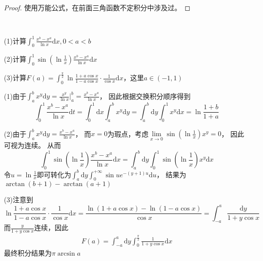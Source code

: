 \begin{proof}
  使用万能公式，在前面三角函数不定积分中涉及过。
\end{proof}

~

\begin{exercise}[积分：涉及$\frac{x^b - x^a}{\ln x}$型]
  (1)计算$\int_0^1 \frac{x^b - x^a}{\ln x}\mathrm{d} x, 0 < a < b$

  (2)计算$\int_0^1 \sin \left( \ln \frac{1}{x} \right) \frac{x^b - x^a}{\ln x}\mathrm{d}x$

  (3)计算$F(a) = \int_0^{\frac{\pi}{2}} \ln \frac{1 + a \cos x}{1 - a \cos x} \cdot \frac{1}{\cos x}\mathrm{d} x$，这里$a \in (-1,1)$
\end{exercise}

\begin{solution}
  (1)由于$\int_a^b x^y\mathrm{d} y = \frac{x^y}{\ln x} \bigg|_a^b = \frac{x^b - x^a}{\ln x}$，
  因此根据交换积分顺序得到
  \begin{equation*}
    \int_0^1 \frac{x^b - x^a}{\ln x}\mathrm{d}t = \int_0^1 \mathrm{d} x \int_a^b x^y\mathrm{d} y = \int_a^b \mathrm{d} y \int_0^1 x^y \mathrm{d} x = \ln \frac{1 + b}{1+a}
  \end{equation*}

  (2)由于$\int_a^b x^y \mathrm{d} y = \frac{x^b - x^a}{\ln x}$，
  而$x = 0$为瑕点，考虑$\lim \limits _{x \rightarrow 0} \sin \left( \ln \frac{1}{x} \right) x^y = 0$，
  因此可视为连续。
  从而
  \begin{equation*}
    \int_0^1 \sin \left( \ln \frac{1}{x} \right) \frac{x^b - x^a}{\ln x}\mathrm{d} x = \int_a^b \mathrm{d} y \int_0^1 \sin \left( \ln \frac{1}{x} \right)x^y \mathrm{d} x
  \end{equation*}
  令$u = \ln \frac{1}{x}$即可转化为$\int_a^b \mathrm{d} y \int_0^{+\infty} \sin u e^{-(y+1)u}\mathrm{d} u$，
  结果为$\arctan(b + 1) - \arctan (a + 1)$

  (3)注意到
  \begin{equation*}
    \ln \frac{1 + a \cos x}{1 - a \cos x} \cdot \frac{1}{\cos x}\mathrm{d} x = \frac{\ln(1 + a \cos x) - \ln(1 - a \cos x)}{\cos x} = \int_{-a}^a \frac{\mathrm{d} y}{1 + y \cos x}
  \end{equation*}
  而$\frac{y}{1+y\cos x}$连续，因此
  \begin{align*}
    F(a) = \int_{-a}^a \mathrm{d} y \int_0^{\frac{\pi}{2}} \frac{1}{1 + y \cos x}\mathrm{d} x
  \end{align*}
  最终积分结果为$\pi \arcsin a$
\end{solution}

